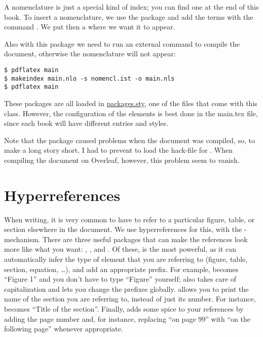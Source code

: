 A nomenclature is just a special kind of index; you can find one at the end of
this book. To insert a nomenclature, we use the package  and
add the terms with the command . We put then a
 where we want it to appear.

Also with this package we need to run an external command to compile the 
document, otherwise the nomenclature will not appear:

\begin{lstlisting}[style=kaolstplain]
$ pdflatex main
$ makeindex main.nlo -s nomencl.ist -o main.nls
$ pdflatex main
\end{lstlisting}

These packages are all loaded in 
\href{style/packages.sty}{packages.sty}, one of the files that come with 
this class. However, the configuration of the elements is best done in 
the main.tex file, since each book will have different entries and 
styles.

Note that the  package caused problems when the 
document was compiled, so, to make a long story short, I had to prevent 
 to load the hack-file for . When 
compiling the document on Overleaf, however, this problem seem to 
vanish.


\section{Hyperreferences}
\label{hyprefs}

When writing, it is very common to have to refer to a particular
figure, table, or section elsewhere in the document. We use
hyperreferences for this, with the -
mechanism. There are three useful packages that can make the references
look more like what you want: , ,
and . Of these,
 is the most powerful, as it can automatically
infer the type of element that you are referring to (figure, table,
section, equation, \ldots), and add an appropriate prefix. For
example,  becomes \enquote{Figure 1} and you
don't have to type \enquote{Figure} yourself; 
also takes care of capitalization and lets you change the prefixes
globally.  allows you to print the name of the section
you are referring to, instead of just its number. For instance,
 becomes \enquote{Title of the section}.
Finally,  adds some spice to your references by adding
the page number and, for instance, replacing \enquote{on page 99} with
\enquote{on the following page} whenever appropriate.

